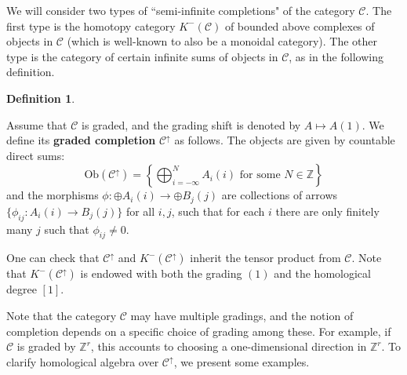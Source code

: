 \documentclass[12pt]{amsart}
\numberwithin{equation}{section}
\theoremstyle{definition}
\newtheorem{definition}[theorem]{Definition}
\theoremstyle{remark}
\newcommand{\cat}{\mathcal{C}}
\newcommand{\BZ}{\mathbb{Z}}
\renewcommand{\1}{\mathbf{1}}
\begin{document}
We will consider two types of ``semi-infinite completions" of the category $\cat$. The first type is the homotopy category $K^{-}(\cat)$ of bounded above complexes of objects in $\cat$ (which is well-known to also be a monoidal category). The other type is the category of certain infinite sums of objects in $\cat$, as in the following definition.

\begin{definition}
\label{def:completion}

Assume that $\cat$ is graded, and the grading shift is denoted by $A \mapsto A(1)$. We define its \textbf{graded completion} $\cat^{\uparrow}$ as follows. The objects are given by countable direct sums:
$$
\text{Ob}(\cat^\uparrow) = \left\{ \bigoplus_{i=-\infty}^N A_i(i) \text{ for some }N \in \BZ \right \}
$$ 
and the morphisms $\phi: \oplus A_i(i)\rightarrow \oplus B_j(j)$ are collections of arrows $\{\phi_{ij}:A_i(i)\to B_j(j) \}$ for all $i,j$, such that for each $i$ there are only finitely many $j$ such that $\phi_{ij}\neq 0$. %
\end{definition}

One can check that $\cat^{\uparrow}$ and $K^{-}(\cat^{\uparrow})$ inherit the tensor product from $\cat$. Note that $K^{-}(\cat^{\uparrow})$ is endowed with both the grading $(1)$ and the homological degree $[1]$. %


Note that the category $\cat$ may have multiple gradings, and the notion of completion depends on a specific choice of grading among these. For example, if $\cat$ is graded by $\mathbb{Z}^r$, this accounts to choosing a one-dimensional direction in $\mathbb{Z}^r$. To clarify homological algebra over $\cat^{\uparrow}$, we present some examples.
\end{document}
